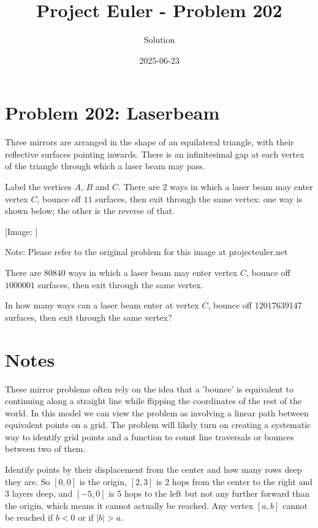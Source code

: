 \documentclass{article}
\title{Project Euler - Problem 202}
\author{Solution}
\date{2025-06-23}
\begin{document}
\maketitle

\section*{Problem 202: Laserbeam}


Three mirrors are arranged in the shape of an equilateral triangle, with their reflective surfaces pointing inwards. There is an infinitesimal gap at each vertex of the triangle through which a laser beam may pass.

\par
Label the vertices $A$, $B$ and $C$. There are $2$ ways in which a laser beam may enter vertex $C$, bounce off $11$ surfaces, then exit through the same vertex: one way is shown below; the other is the reverse of that.

\par
\begin{center}
[Image: ]

\par
Note: Please refer to the original problem for this image at projecteuler.net
\end{center}
There are $80840$ ways in which a laser beam may enter vertex $C$, bounce off $1000001$ surfaces, then exit through the same vertex.

\par
In how many ways can a laser beam enter at vertex $C$, bounce off $12017639147$ surfaces, then exit through the same vertex?

\par


\section*{Notes}

These mirror problems often rely on the idea that a 'bounce' is equivalent to continuing along a straight line while flipping the coordinates of the rest of the world.  In this model we can view the problem as involving a linear path between equivalent points on a grid.  The problem will likely turn on creating a systematic way to identify grid points and a function to count line traversals or bounces between two of them.

\par

Identify points by their displacement from the center and how many rows deep they are.  So $[0, 0]$ is the origin, $[2, 3]$ is 2 hops from the center to the right and 3 layers deep, and $[-5, 0]$ is 5 hops to the left but not any further forward than the origin, which means it cannot actually be reached.  Any vertex $[a, b]$ cannot be reached if $b < 0$ or if $|b| > a$.
\end{document}
